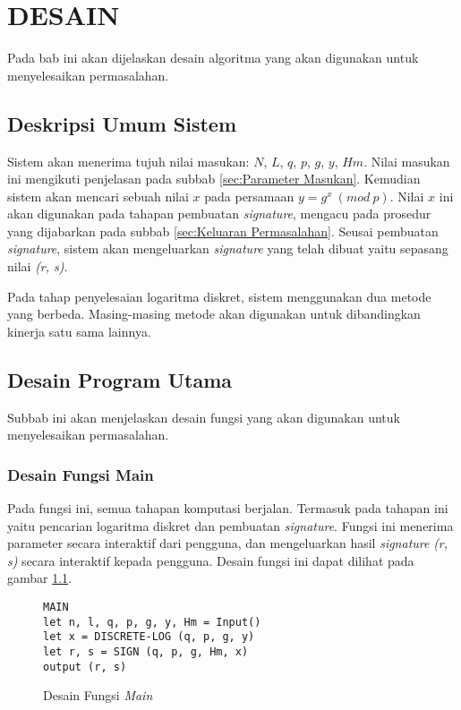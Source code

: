 \chapter{DESAIN}

Pada bab ini akan dijelaskan desain algoritma yang akan digunakan untuk menyelesaikan permasalahan.

\section{Deskripsi Umum Sistem}

Sistem akan menerima tujuh nilai masukan: $ N $, $ L $, $ q $, $ p $, $ g $, $ y $, $ Hm $. Nilai masukan ini mengikuti penjelasan pada subbab \ref{sec:Parameter Masukan}. Kemudian sistem akan mencari sebuah nilai $ x $ pada persamaan $ y=g^x\ (mod\ p) $. Nilai $ x $ ini akan digunakan pada tahapan pembuatan \textit{signature}, mengacu pada prosedur yang dijabarkan pada subbab \ref{sec:Keluaran Permasalahan}. Seusai pembuatan \textit{signature}, sistem akan mengeluarkan \textit{signature} yang telah dibuat yaitu sepasang nilai \textit{(r, s)}.

Pada tahap penyelesaian logaritma diskret, sistem menggunakan dua metode yang berbeda. Masing-masing metode akan digunakan untuk dibandingkan kinerja satu sama lainnya.

\section{Desain Program Utama}

Subbab ini akan menjelaskan desain fungsi yang akan digunakan untuk menyelesaikan permasalahan.

\subsection {Desain Fungsi Main}

Pada fungsi ini, semua tahapan komputasi berjalan. Termasuk pada tahapan ini yaitu pencarian logaritma diskret dan pembuatan \textit{signature}. Fungsi ini menerima parameter secara interaktif dari pengguna, dan mengeluarkan hasil \textit{signature} \textit{(r, s)} secara interaktif kepada pengguna. Desain fungsi ini dapat dilihat pada gambar \ref{psdo:main}.
\begin{figure}[h!]
\begin{lstlisting}[firstnumber=0]
MAIN
let n, l, q, p, g, y, Hm = Input()
let x = DISCRETE-LOG (q, p, g, y)
let r, s = SIGN (q, p, g, Hm, x)
output (r, s)
\end{lstlisting}
\caption{Desain Fungsi \textit{Main}}
\label{psdo:main}
\end{figure}


